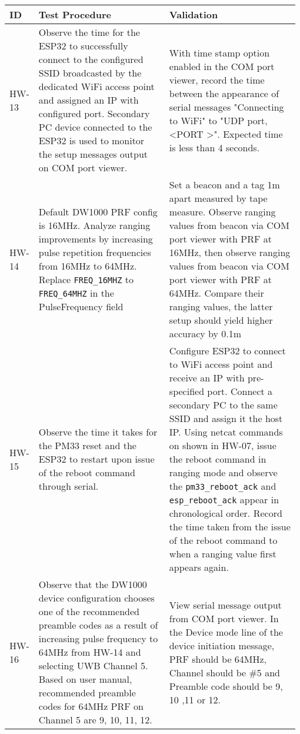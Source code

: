 \begin{table}[h!]
    \centering
    \begin{tabular}{|p{0.075\linewidth}|p{0.45\linewidth}|p{0.45\linewidth}|} 
    \hline
    ID & Test Procedure & Validation\\ 
	
	\hline
 	HW-13
    	& Observe the time for the ESP32 to successfully connect to the configured SSID broadcasted by the dedicated WiFi access point and assigned an IP with configured port. Secondary PC device connected to the ESP32 is used to monitor the setup messages output on COM port viewer.
	& With time stamp option enabled in the COM port viewer, record the time between the appearance of serial messages "Connecting to WiFi" to "UDP port, \textless PORT \textgreater". Expected time is less than 4 seconds. \\
	
	\hline
	HW-14
	& Default DW1000 PRF config is 16MHz. Analyze ranging improvements by increasing pulse repetition frequencies from 16MHz to 64MHz. Replace \texttt{FREQ\_16MHZ} to \texttt{FREQ\_64MHZ} in the PulseFrequency field	
	& Set a beacon and a tag 1m apart measured by tape measure. Observe ranging values from beacon via COM port viewer with PRF at 16MHz, then observe ranging values from beacon via COM port viewer with PRF at 64MHz. Compare their ranging values, the latter setup should yield higher accuracy by 0.1m \\
	
	\hline
	HW-15
	& Observe the time it takes for the PM33 reset and the ESP32 to restart upon issue of the reboot command through serial.
	& Configure ESP32 to connect to WiFi access point and receive an IP with pre-specified port. Connect a secondary PC to the same SSID and assign it the host IP. Using netcat commands on shown in HW-07, issue the reboot command in ranging mode and observe the \texttt{pm33\_reboot\_ack} and \texttt{esp\_reboot\_ack} appear in chronological order. Record the time taken from the issue of the reboot command to when a ranging value first appears again. \\
	
	\hline
	HW-16
	& Observe that the DW1000 device configuration chooses one of the recommended preamble codes as a result of increasing pulse frequency to 64MHz from HW-14 and selecting UWB Channel 5. Based on user manual, recommended preamble codes for 64MHz PRF on Channel 5 are 9, 10, 11, 12.
	& View serial message output from COM port viewer. In the Device mode line of the device initiation message, PRF should be 64MHz, Channel should be \#5 and Preamble code should be 9, 10 ,11 or 12. \\
	

\end{tabular}
\end{table}
